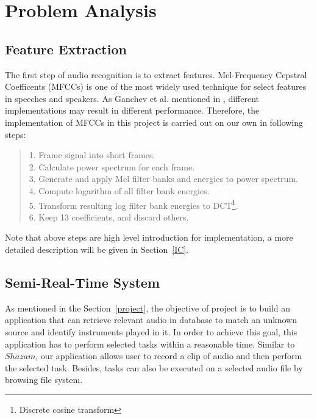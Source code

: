 \documentclass[whitelogo,12pt]{tudelft-report}
\begin{document}
\section{Problem Analysis}
\subsection{Feature Extraction}
The first step of audio recognition is to extract features. Mel-Frequency Cepstral Coefficents (MFCCs) is one of the most widely used technique for select features in speeches and speakers. As Ganchev et al. mentioned in \cite{ganchev2005}, different implementations may result in different performance. Therefore, the implementation of MFCCs in this project is carried out on our own in following steps:
\begin{quote}
1. Frame signal into short frames.\\
2. Calculate power spectrum for each frame.\\
3. Generate and apply Mel filter banks and energies to power spectrum.\\
4. Compute logarithm of all filter bank energies.\\
5. Transform resulting log filter bank energies to DCT\footnote{Discrete cosine transform}.\\
6. Keep 13 coefficients, and discard others.
\end{quote}
Note that above steps are high level introduction for implementation, a more detailed description will be given in Section~\ref{IC}.

\subsection{Semi-Real-Time System}
As mentioned in the Section~\ref{project}, the objective of project is to build an application that can retrieve relevant audio in database to match an unknown source and identify instruments played in it. In order to achieve this goal, this application has to perform selected tasks within a reasonable time. Similar to $Shazam$, our application allows user to record a clip of audio and then perform the selected task. Besides, tasks can also be executed on a selected audio file by browsing file system.
\end{document}
